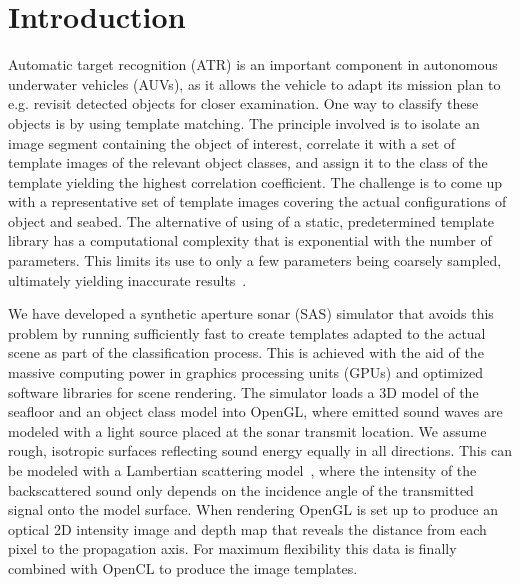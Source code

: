 \documentclass[12pt,journal,draftclsnofoot,onecolumn]{IEEEtran}
\newcommand\1{\vec 1}
\begin{document}
\maketitle

\IEEEdisplaynotcompsoctitleabstractindextext


\IEEEpeerreviewmaketitle

\maketitle

\section{Introduction}

Automatic target recognition (ATR) is an important component in autonomous underwater vehicles (AUVs), as it allows the vehicle to adapt its mission plan to e.g. revisit detected objects for closer examination. One way to classify these objects is by using template matching. The principle involved  is to isolate an image segment containing the object of interest, correlate it with a set of template images of the relevant object classes, and assign it to the class of the template yielding the highest correlation coefficient. The challenge is to come up with a representative set of template images covering the actual configurations of object and seabed. The alternative of using of a static, predetermined template library has a computational complexity that is exponential with the number of parameters. This limits its use to only a few parameters being coarsely sampled, ultimately yielding inaccurate results~\cite{Midelfart2010}.

We have developed a synthetic aperture sonar (SAS) simulator that avoids this problem by running sufficiently fast to create templates adapted to the actual scene as part of the classification process. This is achieved with the aid of the massive computing power in graphics processing units (GPUs) and optimized software libraries for scene rendering. The simulator loads a 3D model of the seafloor and an object class model into OpenGL, where emitted sound waves are modeled with a light source placed at the sonar transmit location. We assume rough, isotropic surfaces reflecting sound energy equally in all directions. This can be modeled with a Lambertian scattering model~\cite{Blake1993,Bell1995}, where the intensity of the backscattered sound only depends on the incidence angle of the transmitted signal onto the model surface. When rendering OpenGL is set up to produce an optical 2D intensity image and depth map that reveals the distance from each pixel to the propagation axis. For maximum flexibility this data is finally combined with OpenCL to produce the image templates.
\end{document}
